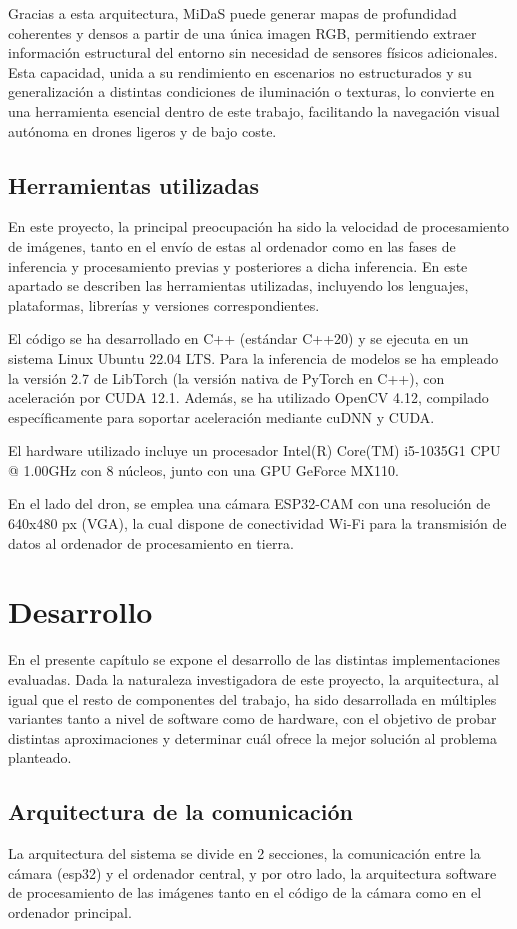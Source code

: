Gracias a esta arquitectura, MiDaS puede generar mapas de profundidad coherentes y densos a partir de una única imagen RGB, permitiendo extraer información estructural del entorno sin necesidad de sensores físicos adicionales. Esta capacidad, unida a su rendimiento en escenarios no estructurados y su generalización a distintas condiciones de iluminación o texturas, lo convierte en una herramienta esencial dentro de este trabajo, facilitando la navegación visual autónoma en drones ligeros y de bajo coste.

    \section{Herramientas utilizadas}
En este proyecto, la principal preocupación ha sido la velocidad de procesamiento de imágenes, tanto en el envío de estas al ordenador como en las fases de inferencia y procesamiento previas y posteriores a dicha inferencia. En este apartado se describen las herramientas utilizadas, incluyendo los lenguajes, plataformas, librerías y versiones correspondientes.

El código se ha desarrollado en C++ (estándar C++20) y se ejecuta en un sistema Linux Ubuntu 22.04 LTS. Para la inferencia de modelos se ha empleado la versión 2.7 de LibTorch (la versión nativa de PyTorch en C++), con aceleración por CUDA 12.1. Además, se ha utilizado OpenCV 4.12, compilado específicamente para soportar aceleración mediante cuDNN y CUDA.

El hardware utilizado incluye un procesador Intel(R) Core(TM) i5-1035G1 CPU @ 1.00GHz con 8 núcleos, junto con una GPU GeForce MX110.

En el lado del dron, se emplea una cámara ESP32-CAM con una resolución de 640x480 px (VGA), la cual dispone de conectividad Wi-Fi para la transmisión de datos al ordenador de procesamiento en tierra.

  \chapter{Desarrollo}
En el presente capítulo se expone el desarrollo de las distintas implementaciones evaluadas. Dada la naturaleza investigadora de este proyecto, la arquitectura, al igual que el resto de componentes del trabajo, ha sido desarrollada en múltiples variantes tanto a nivel de software como de hardware, con el objetivo de probar distintas aproximaciones y determinar cuál ofrece la mejor solución al problema planteado.
    \section{Arquitectura de la comunicación}
La arquitectura del sistema se divide en 2 secciones, la comunicación entre la cámara (esp32) y el ordenador central, y por otro lado, la arquitectura software de procesamiento de las imágenes tanto en el código de la cámara como en el ordenador principal.

